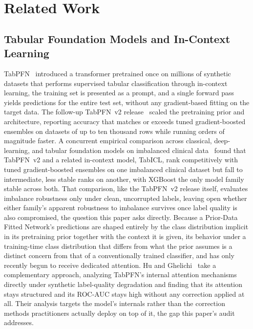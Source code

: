 \section{Related Work}
\label{sec:related-work}

\subsection{Tabular Foundation Models and In-Context Learning}

TabPFN~\cite{hollmann2023tabpfn} introduced a transformer pretrained once on
millions of synthetic datasets that performs supervised tabular classification
through in-context learning, the training set is presented as a prompt, and a
single forward pass yields predictions for the entire test set, without any
gradient-based fitting on the target data. The follow-up TabPFN~v2
release~\cite{hollmann2025tabpfnv2} scaled the pretraining prior and
architecture, reporting accuracy that matches or exceeds tuned gradient-boosted
ensembles on datasets of up to ten thousand rows while running orders of
magnitude faster. A concurrent empirical comparison across classical,
deep-learning, and tabular foundation models on imbalanced clinical
data~\cite{brima2026robustness} found that TabPFN~v2 and a related
in-context model, TabICL, rank competitively with tuned gradient-boosted
ensembles on one imbalanced clinical dataset but fall to intermediate,
less stable ranks on another, with XGBoost the only model family stable
across both. That comparison, like the TabPFN~v2 release itself, evaluates
imbalance robustness only under clean, uncorrupted labels, leaving open
whether either family's apparent robustness to imbalance survives once
label quality is also compromised, the question this paper asks directly.
Because a Prior-Data Fitted Network's predictions are shaped
entirely by the class distribution implicit in its pretraining prior together
with the context it is given, its behavior under a training-time class
distribution that differs from what the prior assumes is a distinct concern
from that of a conventionally trained classifier, and has only recently begun
to receive dedicated attention. Hu and Ghelichi~\cite{hu2026noiseimmunity}
take a complementary approach, analyzing TabPFN's internal attention
mechanisms directly under synthetic label-quality degradation and finding
that its attention stays structured and its ROC-AUC stays high without any
correction applied at all. Their analysis targets the model's internals
rather than the correction methods practitioners actually deploy on top of
it, the gap this paper's audit addresses.

